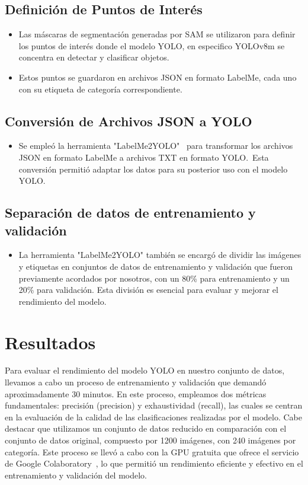 \documentclass[journal]{IEEEtran}
\begin{document}
\subsection{Definición de Puntos de Interés}

\begin{itemize}
    \item Las máscaras de segmentación generadas por SAM se utilizaron para definir los puntos de interés donde el modelo YOLO, en especifico YOLOv8m se concentra en detectar y clasificar objetos.
    \item Estos puntos se guardaron en archivos JSON en formato LabelMe, cada uno con su etiqueta de categoría correspondiente.
\end{itemize}

\subsection{Conversión de Archivos JSON a YOLO}

\begin{itemize}
    \item Se empleó la herramienta "LabelMe2YOLO"~\cite{label2Yolo} para transformar los archivos JSON en formato LabelMe a archivos TXT en formato YOLO.\ Esta conversión permitió adaptar los datos para su posterior uso con el modelo YOLO.
\end{itemize}

\subsection{Separación de datos de entrenamiento y validación}

\begin{itemize}
    \item La herramienta "LabelMe2YOLO" también se encargó de dividir las imágenes y etiquetas en conjuntos de datos de entrenamiento y validación que fueron previamente acordados por nosotros, con un 80\% para entrenamiento y un 20\% para validación.
    Esta división es esencial para evaluar y mejorar el rendimiento del modelo.
\end{itemize}

\section{Resultados}
Para evaluar el rendimiento del modelo YOLO en nuestro conjunto de datos, llevamos a cabo un proceso de entrenamiento y validación que demandó aproximadamente 30 minutos. En este proceso, empleamos dos métricas fundamentales: precisión (precision) y exhaustividad (recall), las cuales se centran en la evaluación de la calidad de las clasificaciones realizadas por el modelo. Cabe destacar que utilizamos un conjunto de datos reducido en comparación con el conjunto de datos original, compuesto por 1200 imágenes, con 240 imágenes por categoría. Este proceso se llevó a cabo con la GPU gratuita que ofrece el servicio de Google Colaboratory~\cite{Colab}, lo que permitió un rendimiento eficiente y efectivo en el entrenamiento y validación del modelo.
\end{document}
